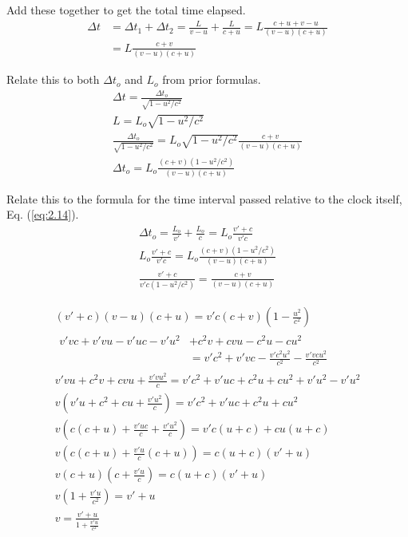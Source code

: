 \documentclass[12pt]{article}
\begin{document}
        Add these together to get the total time elapsed.
        \begin{align}
            \Delta t    &=  \Delta t_1 + \Delta t_2
                =   \frac{L}{v - u} + \frac{L}{c + u}
                =   L \frac{c + u + v - u}{(v - u)(c + u)}\\
                &=  L \frac{c + v}{(v - u)(c + u)}
        \end{align}

        Relate this to both $\Delta t_o$ and $L_o$ from prior formulas.
        \begin{gather}
            \Delta t = \frac{\Delta t_o}{\sqrt{1 - u^2/c^2}}\\
            L = L_o \sqrt{1 - u^2/c^2}\\
            \frac{\Delta t_o}{\sqrt{1 - u^2/c^2}} = L_o \sqrt{1 - u^2/c^2} \frac{c + v}{(v - u)(c + u)}\\
            \Delta t_o  =   L_o \frac{(c + v)(1 - u^2/c^2)}{(v - u)(c + u)}
        \end{gather}

        Relate this to the formula for the time interval passed relative to the clock itself, Eq. (\ref{eq:2.14}).
        \begin{gather}
            \label{eq:2.14} \tag{2.14}
            \Delta t_o = \frac{L_o}{v'} + \frac{L_o}{c}
                =   L_o \frac{v' + c}{v'c}\\
            L_o \frac{v' + c}{v'c} = L_o \frac{(c + v)(1 - u^2/c^2)}{(v - u)(c + u)}\\
            \frac{v' + c}{v'c (1 - u^2/c^2)} = \frac{c + v}{(v - u)(c + u)}
        \end{gather}

        \begin{gather}
            (v' + c)(v - u)(c + u) = v'c(c + v)\left( 1 - \frac{u^2}{c^2} \right)\\
            \begin{split}
                v'vc + v'vu - v'uc - v'u^2 &+ c^2v + cvu - c^2u - cu^2 \\
                    &= v'c^2 + v'vc - \frac{v'c^2u^2}{c^2} - \frac{v'vcu^2}{c^2}
            \end{split}
            \\
            v'vu + c^2v + cvu + \frac{v'vu^2}{c} = v'c^2 + v'uc + c^2u + cu^2 + v'u^2 - v'u^2 \\
            v\left( v'u + c^2 + cu + \frac{v'u^2}{c} \right) = v'c^2 + v'uc + c^2u + cu^2 \\
            v\left( c(c + u) + \frac{v'uc}{c} + \frac{v'u^2}{c} \right) = v'c(u + c) + cu(u + c) \\
            v\left( c(c + u) + \frac{v'u}{c}(c + u) \right) = c(u + c)(v' + u) \\
            v (c + u) \left( c + \frac{v'u}{c} \right) = c(u + c)(v' + u) \\
            v \left( 1 + \frac{v'u}{c^2} \right) = v' + u \\
            \boxed{v = \frac{v' + u}{1 + \frac{v'u}{c^2}}}
        \end{gather}
    \pagebreak
\end{document}
